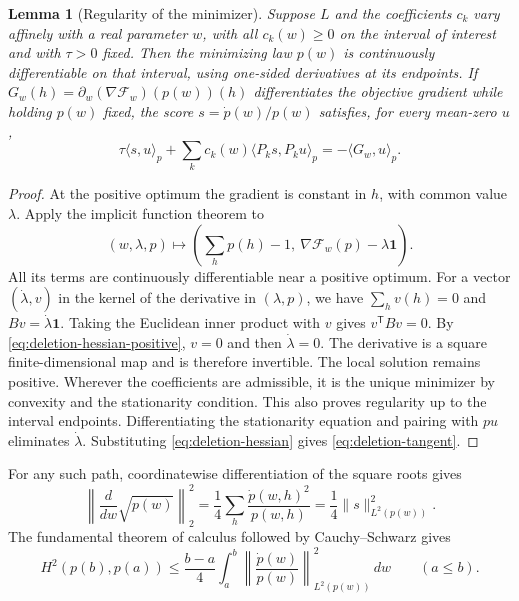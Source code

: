 \documentclass[11pt]{article}
\newtheorem{lemma}[theorem]{Lemma}
\theoremstyle{definition}\newtheorem{definition}[theorem]{Definition}
\begin{document}
\begin{lemma}[Regularity of the minimizer]
\label{lem:deletion-regularity}
Suppose $L$ and the coefficients $c_k$ vary affinely with a real parameter $w$,
with all $c_k(w)\ge0$ on the interval of interest and with $\tau>0$ fixed.
Then the minimizing law $p(w)$ is continuously differentiable on that
interval, using one-sided derivatives at its endpoints. If
$G_w(h)=\partial_w\!\left(\nabla\mathcal F_w\right)(p(w))(h)$ differentiates
the objective gradient while holding $p(w)$ fixed, the score
$s=\dot p(w)/p(w)$ satisfies, for every mean-zero $u$,
\begin{equation}
  \tau\langle s,u\rangle_p+\sum_k c_k(w)\langle P_k s,P_k u\rangle_p
    =-\langle G_w,u\rangle_p.
  \label{eq:deletion-tangent}
\end{equation}
\end{lemma}

\begin{proof}
At the positive optimum the gradient is constant in $h$, with common value
$\lambda$. Apply the implicit function theorem to
\[
  (w,\lambda,p)\longmapsto
      \left(\sum_h p(h)-1,\ \nabla\mathcal F_w(p)-\lambda\mathbf 1\right).
\]
All its terms are continuously differentiable near a positive optimum. For a
vector $(\dot\lambda,v)$ in the kernel of the derivative in $(\lambda,p)$,
we have $\sum_h v(h)=0$ and $Bv=\dot\lambda\mathbf 1$. Taking the Euclidean
inner product with $v$ gives $v^{\mathsf T}Bv=0$. By
\eqref{eq:deletion-hessian-positive}, $v=0$ and then $\dot\lambda=0$.
The derivative is a square finite-dimensional map and is therefore invertible.
The local solution remains positive. Wherever the coefficients are admissible,
it is the unique minimizer by convexity and the stationarity condition. This
also proves regularity up to the interval endpoints. Differentiating the
stationarity equation and pairing with $pu$ eliminates $\dot\lambda$.
Substituting \eqref{eq:deletion-hessian} gives \eqref{eq:deletion-tangent}.
\end{proof}

For any such path, coordinatewise differentiation of the square roots gives
\begin{equation}
  \left\|\frac{d}{dw}\sqrt{p(w)}\right\|_2^2
    =\frac14\sum_h\frac{\dot p(w,h)^2}{p(w,h)}
    =\frac14\|s\|_{L^2(p(w))}^2.
  \label{eq:deletion-speed}
\end{equation}
The fundamental theorem of calculus followed by Cauchy--Schwarz gives
\begin{equation}
  H^2(p(b),p(a))\le\frac{b-a}{4}\int_a^b
             \left\|\frac{\dot p(w)}{p(w)}\right\|_{L^2(p(w))}^2\,dw
  \qquad(a\le b).
  \label{eq:deletion-path}
\end{equation}
\end{document}
